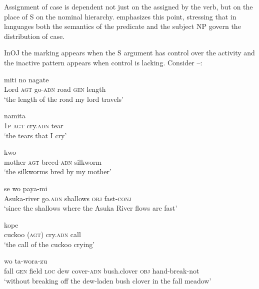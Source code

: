 \documentclass[output=paper]{LSP/langsci}
\begin{document}
Assignment of  case is dependent not just on the  assigned by the verb, but on the place of S on the nominal hierarchy. \citet{Klimov1974Character,Klimov1977Tipologija} emphasizes this point, stressing that in  languages both the semantics of the predicate and the subject NP govern the distribution of  case.

InOJ  the  marking appears when the S argument has control over the activity and the inactive pattern appears when control is lacking. Consider --:

\clearpage
\begin{exe}
\ex%
\label{14-ya-ex:9}
\begin{xlist}
\ex
\label{14-ya-ex:9a}
 miti no nagate\\ %
Lord \textsc{agt} go-\textsc{adn} road \textsc{gen} length\\
\glt ‘the length of the road my lord travels’

\ex
\label{14-ya-ex:9b}
 namita\\ %
\textsc{1p} \textsc{agt} cry.\textsc{adn} tear\\
\glt ‘the tears that I cry’

\ex
\label{14-ya-ex:9c}
 kwo\\ %
mother \textsc{agt} breed-\textsc{adn} silkworm\\
\glt ‘the silkworms bred by my mother’
\end{xlist}
\end{exe}


\begin{exe}
\ex%
\label{14-ya-ex:10}

\begin{xlist}
\ex
\label{14-ya-ex:10a}
 se wo paya-mi\\ %
Asuka-river {} go.\textsc{adn} shallows \textsc{obj} fast-\textsc{conj}\\
\glt ‘since the shallows where the Asuka River flows are fast’

\ex
\label{14-ya-ex:10b}
 kope\\ %
cuckoo (\textsc{agt}) cry.\textsc{adn} call\\
\glt ‘the call of the cuckoo crying’

\ex
\label{14-ya-ex:10c}
 wo ta-wora-zu\\ %
fall \textsc{gen} field \textsc{loc} dew {} cover-\textsc{adn} bush.clover \textsc{obj} hand-break-not\\
\glt ‘without breaking off the dew-laden bush clover in the fall meadow’
\end{xlist}
\end{exe}
\end{document}
